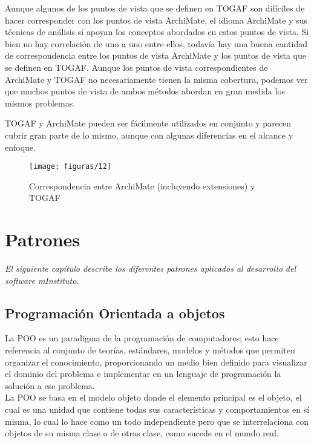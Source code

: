    Aunque algunos de los puntos de vista que se definen en TOGAF son difíciles de hacer corresponder con los puntos de vista ArchiMate, el idioma ArchiMate y sus técnicas de análisis sí apoyan los conceptos abordados en estos puntos de vista. Si bien no hay correlación de uno a uno entre ellos, todavía hay una buena cantidad de correspondencia entre los puntos de vista ArchiMate y los puntos de vista que se definen en TOGAF. Aunque los puntos de vista correspondientes de ArchiMate y TOGAF no necesariamente tienen la misma cobertura, podemos ver que muchos puntos de vista de ambos métodos abordan en gran medida los mismos problemas.
   
   TOGAF y ArchiMate pueden ser fácilmente utilizados en conjunto y parecen cubrir gran parte de lo mismo, aunque con algunas diferencias en el alcance y enfoque.
   
     \begin{figure}[H]
     	\centering
     	\texttt{[image: figuras/12]}
     	\captionsetup{width=.95\textwidth}
     	\caption{Correspondencia entre ArchiMate (incluyendo extensiones) y TOGAF  \cite{ref9}}
     	\label{figura12}
     \end{figure}

\chapter{Patrones}
\label{chap:patrones}
\textit{El siguiente capítulo describe los diferentes patrones aplicados al desarrollo del software mInstituto.}
\vfill
\minitoc
\cleardoublepage

\section{Programación Orientada a objetos}
La POO es un paradigma de la programación de computadores; esto hace referencia al conjunto de teorías, estándares, modelos y métodos que permiten organizar el conocimiento, proporcionando un medio bien definido para visualizar el dominio del problema e implementar en un lenguaje de programación la solución a ese problema. \\

La POO se basa en el modelo objeto donde el elemento principal es el objeto, el cual es una unidad que contiene todas sus características y comportamientos en sí misma, lo cual lo hace como un todo independiente pero que se interrelaciona con objetos de su misma clase o de otras clase, como sucede en el mundo real. \cite{ref11}\\

